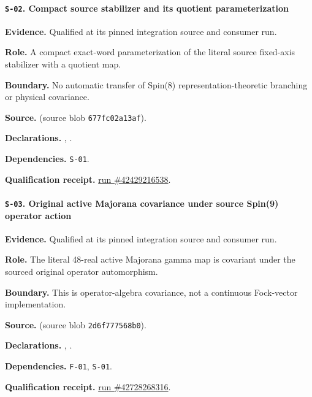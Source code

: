 \paragraph{\texttt{S-02}. Compact source stabilizer and its quotient parameterization}
\noindent\textbf{Evidence.} Qualified at its pinned integration source and consumer run.
\par\noindent\textbf{Role.} A compact exact-word parameterization of the literal source fixed-axis stabilizer with a quotient map.
\par\noindent\textbf{Boundary.} No automatic transfer of Spin(8) representation-theoretic branching or physical covariance.
\par\noindent\textbf{Source.}  (source blob \texttt{677fc02a13af}).
\par\noindent\textbf{Declarations.} , .
\par\noindent\textbf{Dependencies.} \texttt{S-01}.
\par\noindent\textbf{Qualification receipt.} \href{https://github.com/etblink/math/actions/runs/42429216538}{run \#42429216538}.
\medskip

\paragraph{\texttt{S-03}. Original active Majorana covariance under source Spin(9) operator action}
\noindent\textbf{Evidence.} Qualified at its pinned integration source and consumer run.
\par\noindent\textbf{Role.} The literal 48-real active Majorana gamma map is covariant under the sourced original operator automorphism.
\par\noindent\textbf{Boundary.} This is operator-algebra covariance, not a continuous Fock-vector implementation.
\par\noindent\textbf{Source.}  (source blob \texttt{2d6f777568b0}).
\par\noindent\textbf{Declarations.} , .
\par\noindent\textbf{Dependencies.} \texttt{F-01}, \texttt{S-01}.
\par\noindent\textbf{Qualification receipt.} \href{https://github.com/etblink/math/actions/runs/42728268316}{run \#42728268316}.
\medskip

